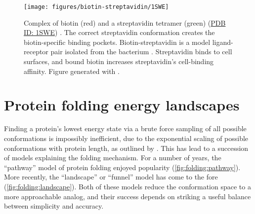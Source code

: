 \begin{figure}
  \begin{center}
  \texttt{[image: figures/biotin-streptavidin/1SWE]}%
  \caption{Complex of biotin (red) and a
    streptavidin tetramer (green)
    (\href{http://dx.doi.org/10.2210/pdb1swe/pdb}{PDB ID: 1SWE})%
    \citep{freitag97}.  The correct streptavidin conformation creates
    the biotin-specific binding pockets.  Biotin-streptavidin is a
    model ligand-receptor pair isolated from the bacterium
    .  Streptavidin
    binds to cell surfaces, and bound biotin increases streptavidin's
    cell-binding affinity\citep{alon90}.  Figure generated with
    .
    \label{fig:ligand-receptor}}
  \end{center}
\end{figure}


\section{Protein folding energy landscapes}
\label{sec:energy-landscape}

Finding a protein's lowest energy state via a brute force sampling of
all possible conformations is impossibly inefficient, due to the
exponential scaling of possible conformations with protein length, as
outlined by \citet{levinthal69}.  This has lead to a succession of
models explaining the folding mechanism.  For a number of years, the
``pathway'' model of protein folding enjoyed popularity
(\cref{fig:folding:pathway})\citep{levinthal69}.  More recently, the
``landscape'' or ``funnel'' model has come to the fore
(\cref{fig:folding:landscape})\citep{dill97}.  Both of these models
reduce the conformation space to a more approachable analog, and their
success depends on striking a useful balance between simplicity and
accuracy.

